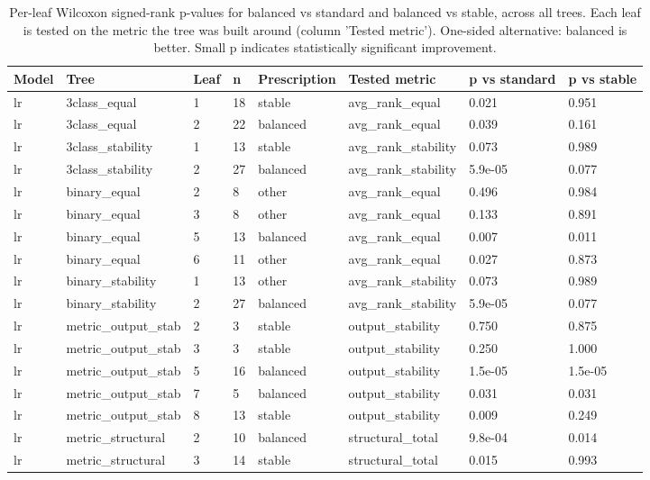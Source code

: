 \begin{table}
\caption{Per-leaf Wilcoxon signed-rank p-values for balanced vs standard and balanced vs stable, across all trees. Each leaf is tested on the metric the tree was built around (column 'Tested metric'). One-sided alternative: balanced is better. Small p indicates statistically significant improvement.}
\label{tab:leaf-pvalues}
\begin{tabular}{llllllll}
\toprule
Model & Tree & Leaf & n & Prescription & Tested metric & p vs standard & p vs stable \\
\midrule
lr & 3class\_equal & 1 & 18 & stable & avg\_rank\_equal & 0.021 & 0.951 \\
lr & 3class\_equal & 2 & 22 & balanced & avg\_rank\_equal & 0.039 & 0.161 \\
lr & 3class\_stability & 1 & 13 & stable & avg\_rank\_stability & 0.073 & 0.989 \\
lr & 3class\_stability & 2 & 27 & balanced & avg\_rank\_stability & 5.9e-05 & 0.077 \\
lr & binary\_equal & 2 & 8 & other & avg\_rank\_equal & 0.496 & 0.984 \\
lr & binary\_equal & 3 & 8 & other & avg\_rank\_equal & 0.133 & 0.891 \\
lr & binary\_equal & 5 & 13 & balanced & avg\_rank\_equal & 0.007 & 0.011 \\
lr & binary\_equal & 6 & 11 & other & avg\_rank\_equal & 0.027 & 0.873 \\
lr & binary\_stability & 1 & 13 & other & avg\_rank\_stability & 0.073 & 0.989 \\
lr & binary\_stability & 2 & 27 & balanced & avg\_rank\_stability & 5.9e-05 & 0.077 \\
lr & metric\_output\_stab & 2 & 3 & stable & output\_stability & 0.750 & 0.875 \\
lr & metric\_output\_stab & 3 & 3 & stable & output\_stability & 0.250 & 1.000 \\
lr & metric\_output\_stab & 5 & 16 & balanced & output\_stability & 1.5e-05 & 1.5e-05 \\
lr & metric\_output\_stab & 7 & 5 & balanced & output\_stability & 0.031 & 0.031 \\
lr & metric\_output\_stab & 8 & 13 & stable & output\_stability & 0.009 & 0.249 \\
lr & metric\_structural & 2 & 10 & balanced & structural\_total & 9.8e-04 & 0.014 \\
lr & metric\_structural & 3 & 14 & stable & structural\_total & 0.015 & 0.993 \\

\end{tabular}
\end{table}
